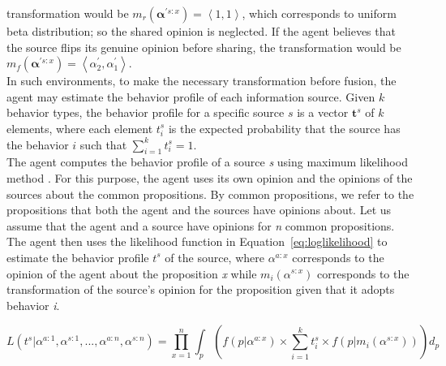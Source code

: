 \documentclass[a4,12pt]{ozu-thesis}
\begin{document}
transformation would be $\mathit{m_{r}\left ( \mathbf{\alpha^{'\mathit{s:x}}} \right )} = \left \langle 1 , 1 \right \rangle$, which corresponds to uniform beta distribution; so the shared opinion is 
neglected. If the agent believes that the source flips its genuine opinion before sharing, the transformation would be $\mathit{m_{f}\left ( \mathbf{\alpha^{'\mathit{s:x}}} \right )} = \left \langle \alpha 
_{2}^{'} , \alpha _{1}^{'} \right \rangle $.
\\In such environments, to make the necessary transformation before fusion, the agent may estimate the behavior profile of each information source. Given $\mathit{k}$ behavior types, the 
behavior profile for a specific source $\mathit{s}$ is a vector $\mathbf{t^{\mathit{s}}}$ of $\mathit{k}$ elements, where each element $\mathit{t_{i}^{s}}$ is the expected probability that the source 
has the behavior $\mathit{i}$ such that $\sum_{i=1}^{k} \mathit{t_{i}^{s}} = 1$.
\\ The agent computes the behavior profile of a source \textit{s} using maximum likelihood method \cite{mendel1995lessons}. For this purpose, the agent uses its own opinion and the opinions 
of the sources about the common propositions. By common propositions, we refer to the propositions that both the agent and the sources have opinions about. Let us assume that the agent 
and a source have opinions for \textit{n} common propositions. The agent then uses the likelihood function in Equation~\ref{eq:loglikelihood} to estimate the behavior profile $\textit{t}^{s}$ of the source, where $
\alpha ^{a:x}$ corresponds to the opinion of the agent about the proposition \textit{x} while $m_{i}\left ( \alpha ^{s:x} \right )$ corresponds to the transformation of the source’s opinion for the 
proposition given that it adopts behavior \textit{i}.

\begin{equation}
\label{eq:loglikelihood}
L\left ( t^{s} | \alpha ^{a:1}, \alpha ^{s:1}, ..., \alpha ^{a:n}, \alpha ^{s:n}\right ) = \prod_{x = 1}^{n} \int_{p} \left ( f\left ( p | \alpha ^{a:x} \right ) \times \sum_{i = 1}^{k} t_{i}^{s} \times  f\left ( p | m_{i}\left ( 
\alpha ^{s:x} \right ) \right )\right )d_{p}
\end{equation}
\end{document}
